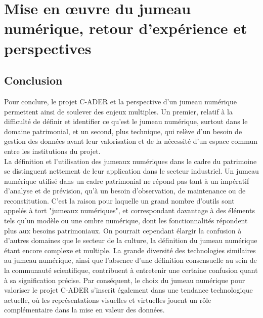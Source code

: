 \documentclass[a4paper,12pt,twoside]{book}
\newcommand{\clearemptydoublepage}{\newpage{\pagestyle{empty}\cleardoublepage}}
\newcommand\mychapter[1]{%
  \chapter*{#1}%
  \markright{\MakeUppercase{#1}}%
}
\begin{document}
  \clearemptydoublepage

\part{Mise en œuvre du jumeau numérique, retour d'expérience et perspectives}
    
    
   \clearemptydoublepage
     
    
    
  \clearemptydoublepage
     
    
            
    \clearemptydoublepage

\mychapter{Conclusion}

Pour conclure, le projet C-ADER et la perspective d'un jumeau numérique permettent ainsi de soulever des enjeux multiples. Un premier, relatif à la difficulté de définir et identifier ce qu'est le jumeau numérique, surtout dans le domaine patrimonial, et un second, plus technique, qui relève d'un besoin de gestion des données avant leur valorisation et de la nécessité d'un espace commun entre les institutions du projet.\\

La définition et l'utilisation des jumeaux numériques dans le cadre du patrimoine se distinguent nettement de leur application dans le secteur industriel. Un jumeau numérique utilisé dans un cadre patrimonial ne répond pas tant à un impératif d'analyse et de prévision, qu'à un besoin d'observation, de maintenance ou de reconstitution. C'est la raison pour laquelle un grand nombre d'outils sont appelés à tort "jumeaux numériques", et correspondant davantage à des éléments tels qu'un modèle ou une ombre numérique, dont les fonctionnalités répondent plus aux besoins patrimoniaux. On pourrait cependant élargir la confusion à d'autres domaines que le secteur de la culture, la définition du jumeau numérique étant encore complexe et multiple. La grande diversité des technologies similaires au jumeau numérique, ainsi que l'absence d'une définition consensuelle au sein de la communauté scientifique, contribuent à entretenir une certaine confusion quant à sa signification précise. Par conséquent, le choix du jumeau numérique pour valoriser le projet C-ADER s'inscrit également dans une tendance technologique actuelle, où les représentations visuelles et virtuelles jouent un rôle complémentaire dans la mise en valeur des données.\\
\end{document}
